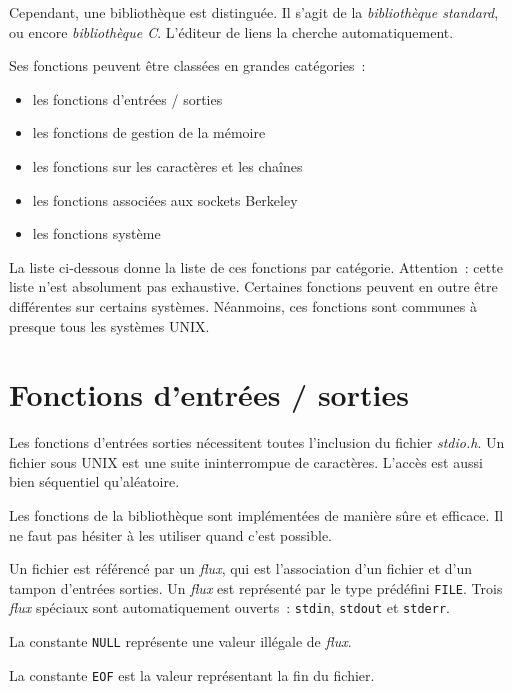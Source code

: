 \documentclass [twoside] {report}
\begin{document}
Cependant, une bibliothèque est distinguée. Il s'agit de la
\emph {bibliothèque standard}, ou encore \emph {bibliothèque C}. L'éditeur
de liens la cherche automatiquement.

Ses fonctions peuvent être classées en grandes catégories~:

\begin {itemize}
    \item les fonctions d'entrées / sorties
    \item les fonctions de gestion de la mémoire
    \item les fonctions sur les caractères et les chaînes
    \item les fonctions associées aux sockets Berkeley
    \item les fonctions système
\end {itemize}

La liste ci-dessous donne la liste de ces fonctions par
catégorie. Attention~: cette liste n'est absolument pas
exhaustive. Certaines fonctions peuvent en outre être
différentes sur certains systèmes. Néanmoins, ces fonctions
sont communes à presque tous les systèmes UNIX.



\section {Fonctions d'entrées / sorties}


Les fonctions d'entrées sorties nécessitent toutes
l'inclusion du fichier \emph {stdio.h}. Un fichier sous UNIX est
une suite ininterrompue de caractères. L'accès est aussi
bien séquentiel qu'aléatoire.

Les fonctions de la bibliothèque sont implémentées de manière
sûre et efficace. Il ne faut pas hésiter à les utiliser
quand c'est possible.

Un fichier est référencé par un \emph {flux}, qui est
l'association d'un fichier et d'un tampon d'entrées sorties.
Un \emph {flux} est représenté par le type prédéfini \texttt {FILE}. Trois
\emph {flux} spéciaux sont automatiquement ouverts~: \texttt {stdin},
\texttt {stdout} et \texttt {stderr}.

La constante \texttt {NULL} représente une valeur illégale de
\emph {flux}.

La constante \texttt {EOF} est la valeur représentant la fin du
fichier.
\end{document}
